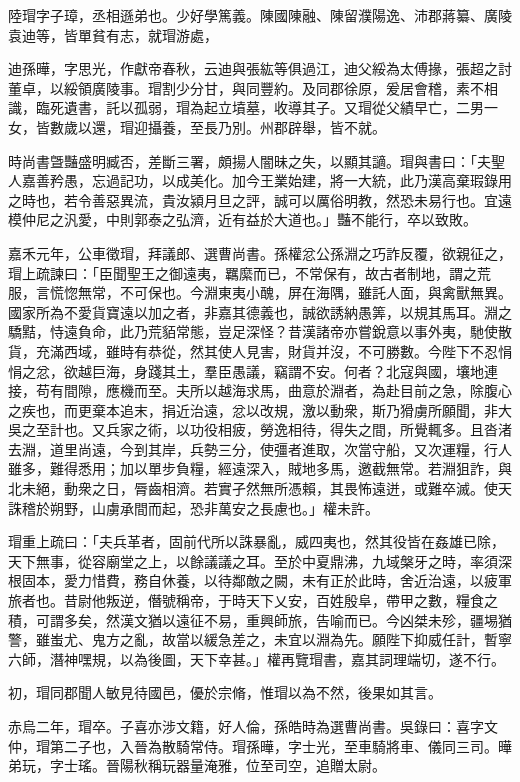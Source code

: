 
\begin{pinyinscope}
陸瑁字子璋，丞相遜弟也。少好學篤義。陳國陳融、陳留濮陽逸、沛郡蔣纂、廣陵袁迪等，皆單貧有志，就瑁游處，

迪孫曄，字思光，作獻帝春秋，云迪與張紘等俱過江，迪父綏為太傅掾，張超之討董卓，以綏領廣陵事。瑁割少分甘，與同豐約。及同郡徐原，爰居會稽，素不相識，臨死遺書，託以孤弱，瑁為起立墳墓，收導其子。又瑁從父績早亡，二男一女，皆數歲以還，瑁迎攝養，至長乃別。州郡辟舉，皆不就。

時尚書曁豔盛明臧否，差斷三署，頗揚人闇昧之失，以顯其讁。瑁與書曰：「夫聖人嘉善矜愚，忘過記功，以成美化。加今王業始建，將一大統，此乃漢高棄瑕錄用之時也，若令善惡異流，貴汝潁月旦之評，誠可以厲俗明教，然恐未易行也。宜遠模仲尼之汎愛，中則郭泰之弘濟，近有益於大道也。」豔不能行，卒以致敗。

嘉禾元年，公車徵瑁，拜議郎、選曹尚書。孫權忿公孫淵之巧詐反覆，欲親征之，瑁上疏諫曰：「臣聞聖王之御遠夷，羈縻而已，不常保有，故古者制地，謂之荒服，言慌惚無常，不可保也。今淵東夷小醜，屏在海隅，雖託人面，與禽獸無異。國家所為不愛貨寶遠以加之者，非嘉其德義也，誠欲誘納愚筭，以規其馬耳。淵之驕黠，恃遠負命，此乃荒貊常態，豈足深怪？昔漢諸帝亦嘗銳意以事外夷，馳使散貨，充滿西域，雖時有恭從，然其使人見害，財貨并沒，不可勝數。今陛下不忍悁悁之忿，欲越巨海，身踐其土，羣臣愚議，竊謂不安。何者？北寇與國，壤地連接，苟有間隙，應機而至。夫所以越海求馬，曲意於淵者，為赴目前之急，除腹心之疾也，而更棄本追末，捐近治遠，忿以改規，激以動衆，斯乃猾虜所願聞，非大吳之至計也。又兵家之術，以功役相疲，勞逸相待，得失之間，所覺輒多。且沓渚去淵，道里尚遠，今到其岸，兵勢三分，使彊者進取，次當守船，又次運糧，行人雖多，難得悉用；加以單步負糧，經遠深入，賊地多馬，邀截無常。若淵狙詐，與北未絕，動衆之日，脣齒相濟。若實孑然無所憑賴，其畏怖遠迸，或難卒滅。使天誅稽於朔野，山虜承間而起，恐非萬安之長慮也。」權未許。

瑁重上疏曰：「夫兵革者，固前代所以誅暴亂，威四夷也，然其役皆在姦雄已除，天下無事，從容廟堂之上，以餘議議之耳。至於中夏鼎沸，九域槃牙之時，率須深根固本，愛力惜費，務自休養，以待鄰敵之闕，未有正於此時，舍近治遠，以疲軍旅者也。昔尉他叛逆，僭號稱帝，于時天下乂安，百姓殷阜，帶甲之數，糧食之積，可謂多矣，然漢文猶以遠征不易，重興師旅，告喻而已。今凶桀未殄，疆埸猶警，雖蚩尤、鬼方之亂，故當以緩急差之，未宜以淵為先。願陛下抑威任計，暫寧六師，潛神嘿規，以為後圖，天下幸甚。」權再覽瑁書，嘉其詞理端切，遂不行。

初，瑁同郡聞人敏見待國邑，優於宗脩，惟瑁以為不然，後果如其言。

赤烏二年，瑁卒。子喜亦涉文籍，好人倫，孫皓時為選曹尚書。吳錄曰：喜字文仲，瑁第二子也，入晉為散騎常侍。瑁孫曄，字士光，至車騎將車、儀同三司。曄弟玩，字士瑤。晉陽秋稱玩器量淹雅，位至司空，追贈太尉。


\end{pinyinscope}